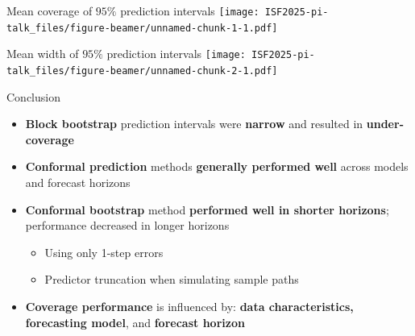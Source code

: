 \documentclass[
  12pt,
  ignorenonframetext,
  aspectratio=169,
]{beamer}
\begin{document}
\begin{frame}{Mean coverage of \(95\%\) prediction intervals}
\label{mean-coverage-of-95-prediction-intervals}
\texttt{[image: ISF2025-pi-talk\_files/figure-beamer/unnamed-chunk-1-1.pdf]}
\end{frame}

\begin{frame}{Mean width of \(95\%\) prediction intervals}
\label{mean-width-of-95-prediction-intervals}
\texttt{[image: ISF2025-pi-talk\_files/figure-beamer/unnamed-chunk-2-1.pdf]}
\end{frame}

\begin{frame}{Conclusion}
\label{conclusion}
\begin{tcolorbox}[enhanced jigsaw, colback=white, colframe=quarto-callout-note-color-frame, breakable, titlerule=0mm, toprule=.15mm, leftrule=.75mm, opacitybacktitle=0.6, bottomtitle=1mm, left=2mm, bottomrule=.15mm, opacityback=0, toptitle=1mm, arc=.35mm, title=\textcolor{quarto-callout-note-color}{\faInfo}\hspace{0.5em}{\color{blue} Summary of results:}, coltitle=black, rightrule=.15mm, colbacktitle=quarto-callout-note-color!10!white]

\begin{itemize}
    \item \textbf{\color{violet} Block bootstrap} prediction intervals were \textbf{narrow} and resulted in \textbf{under-coverage}
    \pause
    \item \textbf{\color{violet} Conformal prediction} methods \textbf{generally performed well} across models and forecast horizons
    \pause
    \item \textbf{\color{violet} Conformal bootstrap} method \textbf{performed well in shorter horizons}; performance decreased in longer horizons
    \begin{itemize}
      \pause
      \item \color{brown} Using only 1-step errors
      \pause
      \item \color{brown} Predictor truncation when simulating sample paths
    \end{itemize}
    \pause
    \item \textbf{\color{violet}Coverage performance} is influenced by: \textbf{data characteristics, forecasting model}, and \textbf{forecast horizon}
\end{itemize}

\end{tcolorbox}
\end{frame}
\end{document}
